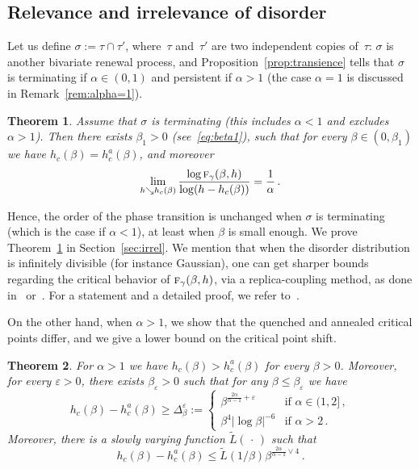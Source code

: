 \documentclass[10pt]{amsart}
\newtheorem{theo}{Theorem}[section]
\theoremstyle{definition}\newtheorem{defi}[theo]{Definition}\newtheorem{rema}[theo]{Remark}\newtheorem{exam}[theo]{Example}\newtheorem{exem}[theo]{Example}\newtheorem{nota}[theo]{Notation}
\newcommand{\ga}{\alpha}
\newcommand{\gb}{\beta}
\newcommand{\gep}{\varepsilon}
\newcommand{\gD}{\Delta}
\newcommand{\tf}{\textsc{f}} %
\renewcommand{\tilde}{\widetilde}
\begin{document}
\subsection{Relevance and irrelevance of disorder}

Let us define $\sigma :=\tau \cap \tau'$, where~$\tau$ and~$\tau'$ are two independent copies of~$\tau$: $\sigma$ is another bivariate renewal process, and Proposition~\ref{prop:transience} tells that $\sigma$ is terminating if $\ga\in(0,1)$ and persistent if $\ga>1$ (the case $\ga=1$ is discussed in Remark~\ref{rem:alpha=1}).


\begin{theo}\label{thm:irrel}
Assume that $\sigma$ is terminating (this includes $\ga<1$ and excludes $\ga >1$). Then there exists $\beta_1>0$ (see~\eqref{eq:beta1}), such that for every $\beta \in (0,\beta_1)$ we have $h_c(\beta) = h_c^a(\beta)$, and moreover
\begin{equation}\label{eq:s2}
\lim_{h \searrow h_c(\beta)} \frac{\log \tf_{\gamma}(\beta,h)}{\log (h-h_c(\beta))} = \frac{1}{\ga}\,.
\end{equation}
\end{theo}

Hence, the order of the phase transition is unchanged when $\sigma$ is terminating (which is the case if $\ga<1$), at least when $\gb$ is small enough. We prove Theorem~\ref{thm:irrel} in Section~\ref{sec:irrel}. We mention that when the disorder distribution is infinitely divisible (for instance Gaussian), one can get sharper bounds regarding the critical behavior of $\tf_{\gamma}(\beta,h)$, via a replica-coupling method, as done in~\cite{cf:Ton08} or~\cite{cf:Wa12}. For a statement and a detailed proof, we refer to~\cite{cf:Khatib}.

On the other hand, when $\ga>1$, we show that the quenched and annealed critical points differ, and we give a lower bound on the critical point shift.


\begin{theo}\label{thm:rel}
For $\ga>1$ we have $h_c(\gb) > h_c^{a}(\gb)$ for every $\beta>0$. Moreover, for every $\gep>0$, there exists $\gb_{\gep}>0$ such that for any $\gb\leq \gb_\gep$ we have
\begin{equation}\label{eq:rel}
h_c(\beta) - h_c^{a}(\beta)\ge \gD_{\gb}^{\gep}:=
\begin{cases}
\gb^{\frac{2\ga}{\ga-1} +\gep} & \text{if } \ga\in(1,2]\,, \\
\gb^4 \mathopen|\log \gb |^{-6} & \text{if } \ga >2\,.
\end{cases}
\end{equation}
Moreover, there is a slowly varying function $\tilde{L}({\,\cdot\,})$ such that
\begin{equation}\label{eq:upb}
h_c(\beta) - h_c^a (\beta) \le
\tilde{L}(1/\gb) \gb^{\frac{2\ga}{\ga-1} \vee 4}\,.
\end{equation}
\end{theo}
\end{document}
